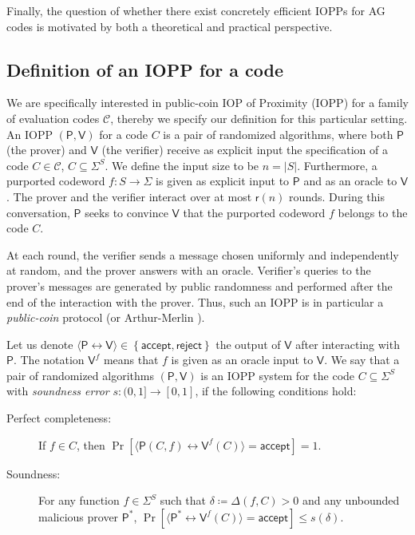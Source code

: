 \documentclass[10pt,a4paper]{article}
\newcommand\prover{\mathsf{P}}
\newcommand\verifier{\mathsf{V}}
\newcommand{\set}[1]{\left\{#1\right\}}
\newcommand{\size}[1]{\left|#1\right|}
\newcommand\mydef{\coloneqq}
\theoremstyle{plain}
\theoremstyle{plain}
\theoremstyle{definition}
\theoremstyle{remark}
\theoremstyle{plain}
\begin{document}
Finally, the question of whether there exist concretely efficient IOPPs for AG codes is motivated by both a theoretical and practical perspective. 

\subsection{Definition of an IOPP for a code}\label{subsec:def-iopp}

We are specifically interested in public-coin IOP of Proximity (IOPP) for a family of evaluation codes $\mathscr{C}$, thereby we specify our definition for this particular setting. An IOPP  $(\prover, \verifier)$ for a code $C$ is a pair of randomized algorithms, where both $\prover$ (the prover) and $\verifier$ (the verifier) receive as explicit input the specification of a code $C \in \mathscr{C}$, $C \subseteq \Sigma^S$. We define the input size to be $n = \size{S}$. Furthermore, a purported codeword $f : S \rightarrow \Sigma$ is given as explicit input to $\prover$ and as an oracle to $\verifier$. The prover and the verifier interact over at most $\mathsf{r}(n)$ rounds. During this conversation, $\prover$ seeks to convince $\verifier$ that the purported codeword $f$ belongs to the code $C$. 

At each round, the verifier sends a message chosen uniformly and independently at random, and the prover answers with an oracle. Verifier's queries to the prover's messages are generated by public randomness and performed after the end of the interaction with the prover. Thus, such an IOPP is in particular a \emph{public-coin} protocol (or Arthur-Merlin \cite{Bab85}). 

Let us denote $\langle \prover \leftrightarrow \verifier \rangle \in \set{\textsf{accept}, \textsf{reject}}$ the output of $\verifier$ after interacting with $\prover$. The notation $\verifier^f$ means that $f$ is given as an oracle input to $\verifier$. We say that a pair of randomized algorithms $(\prover, \verifier)$ is an IOPP system for the code $C \subseteq \Sigma^S$ with \emph{soundness error} $s : (0,1] \rightarrow [0,1]$, if the following conditions hold:

\begin{description}
	\item[Perfect completeness:] If $f \in C$, then $\Pr[\langle \prover (C, f)\leftrightarrow \verifier^{f}(C) \rangle = \textsf{accept}] = 1$.
	\item[Soundness:] For any function $f \in \Sigma^S$ such that $\delta \mydef \Delta(f, C) > 0$ and any unbounded malicious prover $ \prover^*$, $\Pr[\langle \prover^* \leftrightarrow \verifier^{f}(C) \rangle = \textsf{accept}] \leq s(\delta).$
\end{description}
\end{document}
